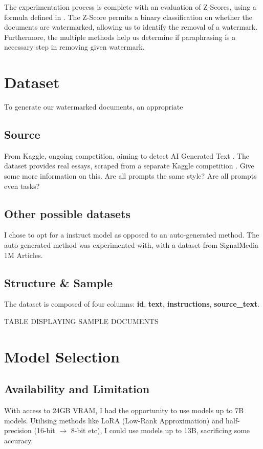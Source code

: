 \documentclass{l4proj}
\theoremstyle{definition}
\begin{document}
    The experimentation process is complete with an evaluation of Z-Scores, using a formula defined in \citet{kirchenbauer2023watermark}. The Z-Score permits a binary classification on whether the documents are watermarked, allowing us to identify the removal of a watermark. Furthermore, the multiple methods help us determine if paraphrasing is a necessary step in removing given watermark.

\section{Dataset}
    To generate our watermarked documents, an appropriate 
    \subsection{Source}
        From Kaggle, ongoing competition, aiming to detect AI Generated Text \citep{llm-detect-ai-generated-text}. The dataset provides real essays, scraped from a separate Kaggle competition \citet{link feedback prize 3 kaggle}.
        Give some more information on this. Are all prompts the same style? Are all prompts even tasks?
        
    \subsection{Other possible datasets}
        I chose to opt for a instruct model as opposed to an auto-generated method. The auto-generated method was experimented with, with a dataset from SignalMedia 1M Articles. 
    \subsection{Structure \& Sample}
        The dataset is composed of four columns: \textbf{id}, \textbf{text}, \textbf{instructions}, \textbf{source\_text}.

        TABLE DISPLAYING SAMPLE DOCUMENTS

\section{Model Selection}
    \subsection{Availability and Limitation}
        With access to 24GB VRAM, I had the opportunity to use models up to 7B models. Utilising methods like LoRA (Low-Rank Approximation) and half-precision (16-bit $\rightarrow$ 8-bit etc), I could use models up to 13B, sacrificing some accuracy. 
\end{document}
